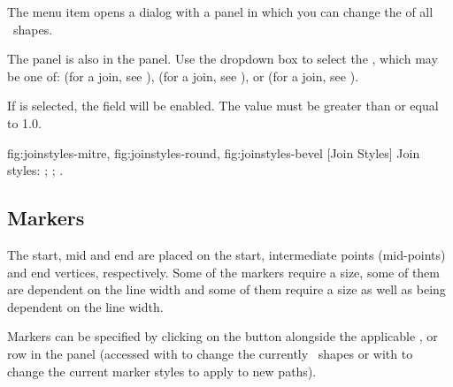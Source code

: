 The  menu item opens a dialog
with a  panel in which
you can change the  
of all \selected\ \glspl{shape}.


The  panel is also in the 
 panel. Use the dropdown box to select the
, which may be one of:
(for a  join, see
),
(for a  join, see
), or
(for a  join, see
).


If  is selected, the 
field will be enabled. The value must be greater than or equal to
1.0.

{
   {fig:joinstyles-mitre}{}{},
   {fig:joinstyles-round}{}{},
   {fig:joinstyles-bevel}{}{}
}
[Join Styles]
{Join styles:
 ;
 ;
 .}

\subsection{Markers}\label{sec:markers}

The start, mid and end  are placed on
the start, intermediate points (mid-points) and end vertices, respectively. Some of the
markers require a size, some of them are dependent on the line width
and some of them require a size as well as being dependent on the
line width.

Markers can be specified by clicking on the 
button alongside the applicable ,
 or 
row in the  panel (accessed with 
to change the currently \selected\ shapes or with
 to change the current marker styles to apply
to new \glspl{path}).

